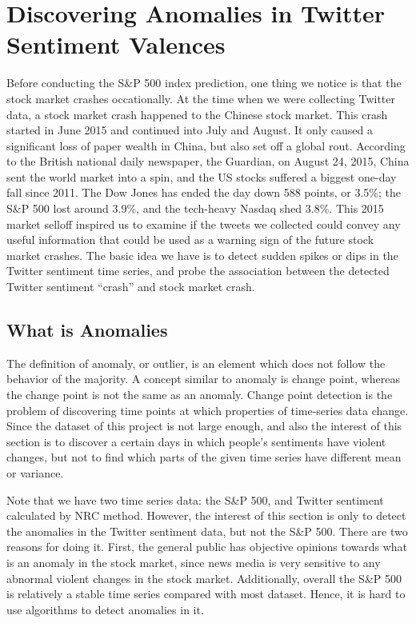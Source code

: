 \documentclass[10pt,letterpaper]{article}
\begin{document}
\section{Discovering Anomalies in Twitter Sentiment Valences} 

Before conducting the S\&P 500 index prediction, one thing we notice is that the stock market crashes occationally. At the time when we were collecting Twitter data, a stock market crash happened to the Chinese stock market. This crash started in June 2015 and continued into July and August. It only caused a significant loss of paper wealth in China, but also set off a global rout. According to the British national daily newspaper, the Guardian, on August 24, 2015, China sent the world market into a spin, and the US stocks suffered a biggest one-day fall since 2011. The Dow Jones has ended the day down 588 points, or 3.5\%; the S\&P 500 lost around 3.9\%, and the tech-heavy Nasdaq shed 3.8\%. This 2015 market selloff inspired us to examine if the tweets we collected could convey any useful information that could be used as a warning sign of the future stock market crashes. The basic idea we have is to detect sudden spikes or dips in the Twitter sentiment time series, and probe the association between the detected Twitter sentiment ``crash'' and stock market crash.


\subsection{What is Anomalies}
The definition of anomaly, or outlier, is an element which does not follow the behavior of the majority. A concept similar to anomaly is change point, whereas the change point is not the same as an anomaly. Change point detection is the problem of discovering time points at which properties of time-series data change. Since the dataset of this project is not large enough, and also the interest of this section is to discover a certain days in which people's sentiments have violent changes, but not to find which parts of the given time series have different mean or variance. 

Note that we have two time series data: the S\&P 500, and Twitter sentiment calculated by NRC method. However, the interest of this section is only to detect the anomalies in the Twitter sentiment data, but not the S\&P 500. There are two reasons for doing it. First, the general public has objective opinions towards what is an anomaly in the stock market, since news media is very sensitive to any abnormal violent changes in the stock market. Additionally, overall the S\&P 500 is relatively a stable time series compared with most dataset. Hence, it is hard to use algorithms to detect anomalies in it. 
\end{document}
